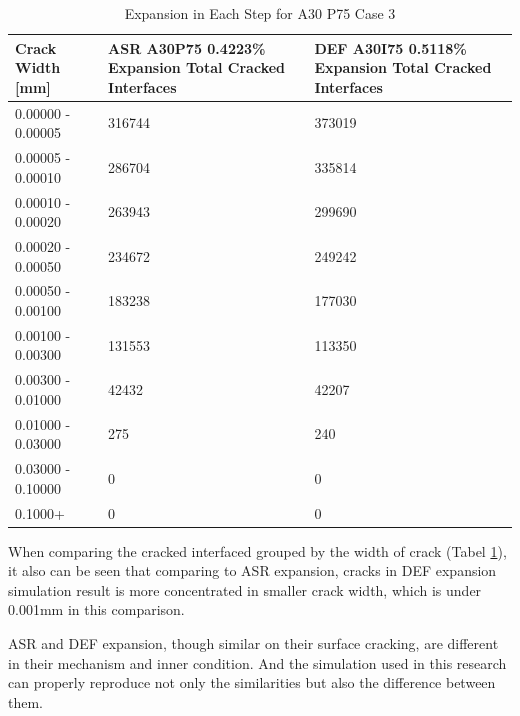\begin{table}[!h]
\centering
\begin{tabular}{ |p{4cm}|p{5cm}|p{5cm}| }
\hline
 Crack Width [mm] &  ASR A30P75 0.4223\% Expansion Total Cracked Interfaces  &  DEF A30I75 0.5118\% Expansion Total Cracked Interfaces \\
 \hline\hline

   0.00000 - 0.00005 & 316744 & 373019 \\
   0.00005 - 0.00010 & 286704 & 335814\\
   0.00010 - 0.00020 & 263943 & 299690\\
   0.00020 - 0.00050 & 234672 & 249242\\
   0.00050 - 0.00100 & 183238 & 177030\\
   0.00100 - 0.00300 & 131553 & 113350\\
   0.00300 - 0.01000 & 42432 & 42207\\
   0.01000 - 0.03000 & 275 & 240\\
   0.03000 - 0.10000 & 0 & 0\\
   0.1000+ & 0 & 0\\

  \hline
  \end{tabular}
\caption{Expansion in Each Step for A30 P75 Case 3}
\label{table:A30P75_3_Cracks}
\end{table}


When comparing the cracked interfaced grouped by the width of crack (Tabel \ref{table:A30P75_3_Cracks}), it also can be seen that comparing to ASR expansion, cracks in DEF expansion simulation result is more concentrated in smaller crack width,  which is under 0.001mm in this comparison.


ASR and DEF expansion, though similar on their surface cracking, are different in their mechanism and inner condition. And the simulation used in this research can properly reproduce not only the similarities but also the difference between them.
